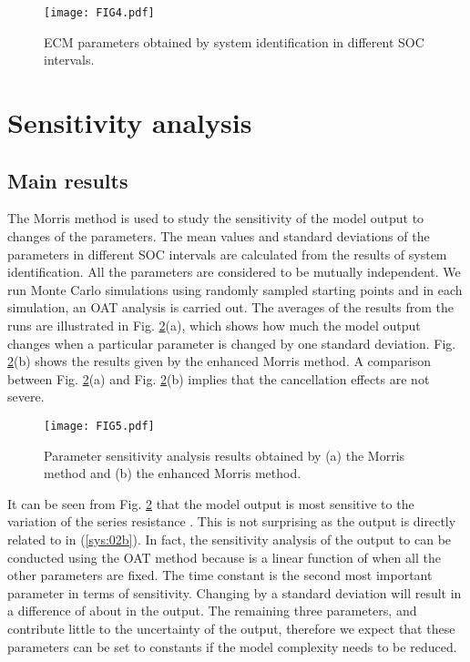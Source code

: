 \documentclass[letterpaper,twocolumn]{IEEEtran}
\begin{document}
\begin{figure}
\centering
\texttt{[image: FIG4.pdf]}
\caption{ECM parameters obtained by system identification in different SOC intervals.}
\label{fig:Figure4}
\end{figure}


\section{Sensitivity analysis}


\subsection{Main results}
The Morris method is used to study the sensitivity of the model output to changes of the parameters. The mean values and standard deviations of the parameters in different SOC intervals are calculated from the results of system identification. All the parameters are considered to be mutually independent. We run  Monte Carlo simulations using randomly sampled starting points and in each simulation, an OAT analysis is carried out. The averages of the results from the  runs are illustrated in Fig. \ref{fig:Figure5}(a), which shows how much the model output changes when a particular parameter is changed by one standard deviation. Fig. \ref{fig:Figure5}(b) shows the results given by the enhanced Morris method. A comparison between Fig. \ref{fig:Figure5}(a) and Fig. \ref{fig:Figure5}(b) implies that the cancellation effects are not severe.
\begin{figure}
\centering
\texttt{[image: FIG5.pdf]}
\caption{Parameter sensitivity analysis results obtained by (a) the Morris method and (b) the enhanced Morris method. }
\label{fig:Figure5}
\end{figure}

It can be seen from Fig. \ref{fig:Figure5} that the model output is most sensitive to the variation of the series resistance . This is not surprising as the output is directly related to  in (\ref{sys:02b}). In fact, the sensitivity analysis of the output to  can be conducted using the OAT method because  is a linear function of  when all the other parameters are fixed. The time constant  is the second most important parameter in terms of sensitivity. Changing  by a standard deviation will result in a difference of about   in the output. The remaining three parameters,  and  contribute little to the uncertainty of the output, therefore we expect that these parameters can be set to constants if the model complexity needs to be reduced.
\end{document}
